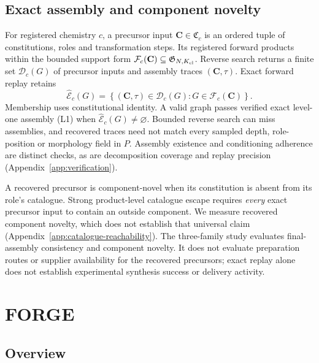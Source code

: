 \documentclass{article}
\theoremstyle{definition}
\begin{document}
\subsection{Exact assembly and component novelty}
For registered chemistry $c$, a precursor input $\mathbf C\in\mathfrak C_c$ is an ordered tuple
of constitutions, roles and transformation steps. Its registered forward products within the
bounded support form $\mathcal F_c(\mathbf C)\subseteq\mathfrak G_{N,K_{\rm cl}}$.
Reverse search returns a finite set $\mathcal D_c(G)$ of precursor inputs and assembly traces
$(\mathbf C,\tau)$. Exact forward replay retains
\begin{equation}
    \widehat{\mathcal E}_c(G)=
    \left\{(\mathbf C,\tau)\in\mathcal D_c(G):G\in\mathcal F_c(\mathbf C)\right\}.
    \label{eq:main-exact-traces}
\end{equation}
Membership uses constitutional identity. A valid graph passes verified exact level-one assembly
(L1) when $\widehat{\mathcal E}_c(G)\neq\varnothing$. Bounded reverse search can miss assemblies,
and recovered traces need not match every sampled depth, role-position or morphology field in $P$.
Assembly existence and conditioning adherence are distinct checks, as are decomposition coverage
and replay precision (Appendix~\ref{app:verification}).

A recovered precursor is component-novel when its constitution is absent from its role's catalogue.
Strong product-level catalogue escape requires \emph{every} exact precursor input to contain an
outside component. We measure recovered component novelty, which does not establish that universal
claim (Appendix~\ref{app:catalogue-reachability}). The three-family study evaluates final-assembly
consistency and component novelty. It does not evaluate preparation routes or supplier availability
for the recovered precursors; exact replay alone does not establish experimental synthesis success
or delivery activity.


\section{FORGE}
\label{sec:method}

\subsection{Overview}
\label{sec:forge-overview}
\end{document}
